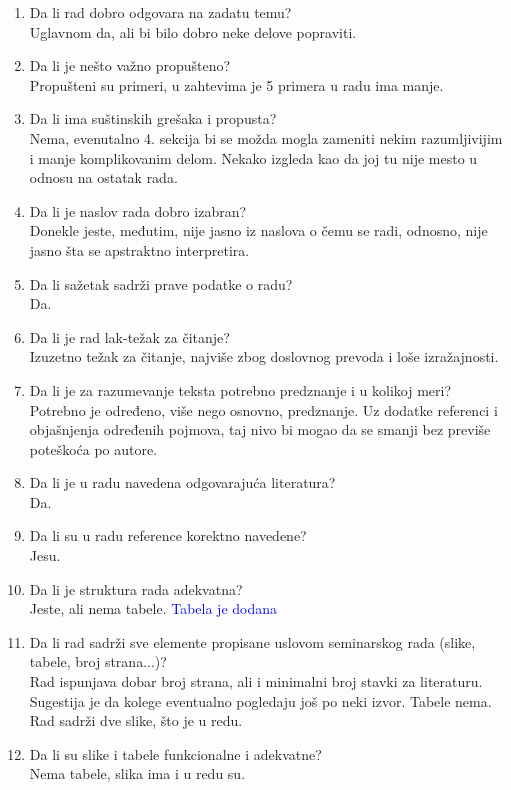 \documentclass[a4paper]{report}
\newcommand{\odgovor}[1]{\textcolor{blue}{#1}}
\begin{document}
\begin{enumerate}
\item Da li rad dobro odgovara na zadatu temu?\\Uglavnom da, ali bi bilo dobro neke delove popraviti.
\item Da li je nešto važno propušteno?\\ Propušteni su primeri, u zahtevima je 5 primera u radu ima manje.
\item Da li ima suštinskih grešaka i propusta?\\ Nema, evenutalno 4. sekcija bi se možda mogla zameniti nekim razumljivijim i manje komplikovanim delom. Nekako izgleda kao da joj tu nije mesto u odnosu na ostatak rada.
\item Da li je naslov rada dobro izabran?\\ Donekle jeste, međutim, nije jasno iz naslova o čemu se radi, odnosno, nije jasno šta se apstraktno interpretira.
\item Da li sažetak sadrži prave podatke o radu?\\ Da.
\item Da li je rad lak-težak za čitanje?\\Izuzetno težak za čitanje, najviše zbog doslovnog prevoda i loše izražajnosti.
\item Da li je za razumevanje teksta potrebno predznanje i u kolikoj meri?\\ Potrebno je određeno, više nego osnovno, predznanje. Uz dodatke referenci i objašnjenja određenih pojmova, taj nivo bi mogao da se smanji bez previše poteškoća po autore.
\item Da li je u radu navedena odgovarajuća literatura?\\ Da.
\item Da li su u radu reference korektno navedene?\\Jesu.
\item Da li je struktura rada adekvatna?\\Jeste, ali nema tabele.
\odgovor{Tabela je dodana}
\item Da li rad sadrži sve elemente propisane uslovom seminarskog rada (slike, tabele, broj strana...)?\\ Rad ispunjava dobar broj strana, ali i minimalni broj stavki za literaturu. Sugestija je da kolege eventualno pogledaju još po neki izvor. Tabele nema. Rad sadrži dve slike, što je u redu. 
\item Da li su slike i tabele funkcionalne i adekvatne?\\ Nema tabele, slika ima i u redu su.
\end{enumerate}
\end{document}
